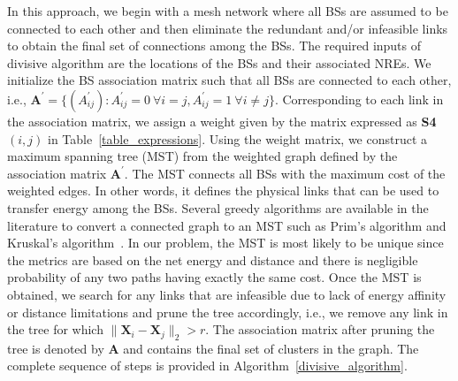 \documentclass[10pt, letter,twocolumn]{IEEEtran}
\begin{document}
In this approach, we begin with a mesh network where all BSs are assumed to be connected to each other and then eliminate the redundant and/or infeasible links to obtain the final set of connections among the BSs. The required inputs of divisive algorithm are the locations of the BSs and their associated NREs. We initialize the BS association matrix such that all BSs are connected to each other, i.e., $\mathbf{A}^{\prime} = \{ (A^{\prime}_{ij})  : A^{\prime}_{ij} = 0 \ \forall i = j, A^{\prime}_{ij} = 1 \ \forall i \neq j\}$. Corresponding to each link in the association matrix, we assign a weight given by the matrix expressed as \textbf{S4}$(i,j)$ in Table~\ref{table_expressions}. Using the weight matrix, we construct a maximum spanning tree (MST) from the weighted graph defined by the association matrix $\mathbf{A}^{\prime}$. The MST connects all BSs with the maximum cost of the weighted edges. In other words, it defines the physical links that can be used to transfer energy among the BSs. Several greedy algorithms are available in the literature to convert a connected graph to an MST such as Prim's algorithm and Kruskal's algorithm~\cite{algorithms}. In our problem, the MST is most likely to be unique since the metrics are based on the net energy and distance and there is negligible probability of any two paths having exactly the same cost. Once the MST is obtained, we search for any links that are infeasible due to lack of energy affinity or distance limitations and prune the tree accordingly, i.e., we remove any link in the tree for which $\| \mathbf{X}_{i} - \mathbf{X}_{j} \|_{2} > r$. The association matrix after pruning the tree is denoted by $\mathbf{A}$ and contains the final set of clusters in the graph. The complete sequence of steps is provided in Algorithm~\ref{divisive_algorithm}. %
\end{document}
